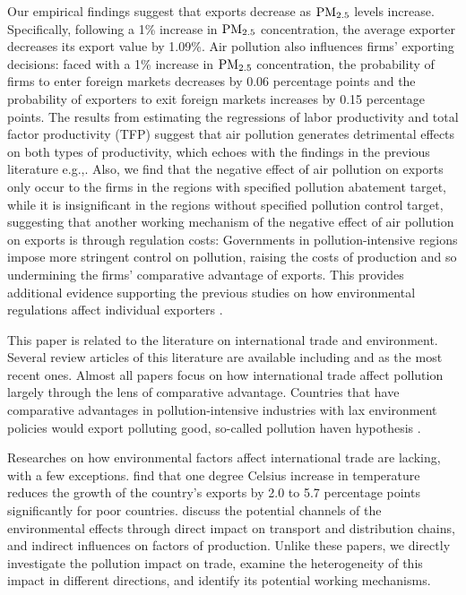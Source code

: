 \documentclass[12pt]{article}
\begin{document}
Our empirical findings suggest that exports decrease as $\rm PM_{2.5}$ levels increase. Specifically, following a 1\% increase in $\rm PM_{2.5}$ concentration, the average exporter decreases its export value by 1.09\%. Air pollution also influences firms' exporting decisions: faced with a 1\% increase in $\rm PM_{2.5}$ concentration, the probability of firms to enter foreign markets decreases by 0.06 percentage points and the probability of exporters to exit foreign markets increases by 0.15 percentage points. The results from estimating the regressions of labor productivity and total factor productivity (TFP)
suggest that air pollution generates detrimental effects on both types of productivity, which echoes with the findings in the previous literature e.g.,\citep{greenstone2012effects,fu2021air,khanna2021productivity}. Also, we find that the negative effect of air pollution on exports only occur to the firms in the regions with specified pollution abatement target, while it is insignificant in the regions without specified pollution control target, suggesting that another working mechanism of the negative effect of air pollution on exports is through regulation costs: Governments in pollution-intensive regions impose more stringent control on pollution, raising the costs of production and so undermining the firms' comparative advantage of exports. This provides additional evidence supporting the previous studies on how environmental regulations affect individual
exporters \citep{cherniwchan2022international}.

This paper is related to the literature on international trade and environment. Several review articles of this literature are available including \cite{cherniwchan2017trade} and \cite{cherniwchan2022international} as the most recent ones. Almost all papers focus on how international trade affect pollution largely through the lens of comparative advantage. Countries that have comparative advantages in pollution-intensive industries with lax
environment policies would export polluting good, so-called pollution haven hypothesis \citep{copeland1994north,taylor2005unbundling}.

Researches on how environmental factors affect international trade are
lacking, with a few exceptions. \cite{jones2010climate} find that one degree
Celsius increase in temperature reduces the growth of the country's exports by 2.0 to 5.7 percentage points significantly for poor countries. \cite{dellink2017international} discuss the potential channels of the environmental effects
through direct impact on transport and distribution chains, and indirect
influences on factors of production. Unlike these papers, we directly
investigate the pollution impact on trade, examine the heterogeneity of this impact in different directions, and identify its potential working mechanisms.  
\end{document}
